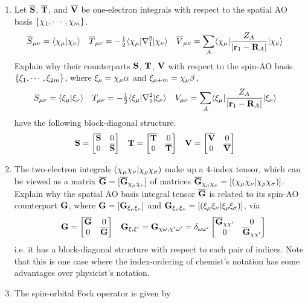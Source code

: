 \documentclass[fleqn,11pt]{article}
\begin{document}
\begin{enumerate}
  \item Let $\overline{\mathbf{S}}$, $\overline{\mathbf{T}}$, and $\overline{\mathbf{V}}$ be one-electron integrals with respect to the spatial AO basis $\{\chi_1,\cdots,\chi_m\}$.
\begin{align}
\label{space-ao-ints}
&
  \overline{S}_{\mu\nu}
=
  \langle\chi_{\mu}|\chi_{\nu}\rangle
&&
  \overline{T}_{\mu\nu}
=
  -\tfrac{1}{2}\langle\chi_{\mu}|\nabla_1^2|\chi_{\nu}\rangle
&&
  \overline{V}_{\mu\nu}
=
  \sum_A\langle\chi_{\mu}|\dfrac{Z_A}{|\mathbf{r}_1-\mathbf{R}_A|}|\chi_{\nu}\rangle
\end{align}
  Explain why their counterparts $\mathbf{S}$, $\mathbf{T}$, $\mathbf{V}$ with respect to the spin-AO basis $\{\xi_1,\cdots,\xi_{2m}\}$, where $\xi_\mu=\chi_\mu\alpha$ and $\xi_{\mu+m}=\chi_\mu\beta$,
\begin{align}
\label{space-ao-ints}
&
  S_{\mu\nu}
=
  \langle\xi_{\mu}|\xi_{\nu}\rangle
&&
  T_{\mu\nu}
=
  -\tfrac{1}{2}\langle\xi_{\mu}|\nabla_1^2|\xi_{\nu}\rangle
&&
  V_{\mu\nu}
=
  \sum_A\langle\xi_{\mu}|\dfrac{Z_A}{|\mathbf{r}_1-\mathbf{R}_A|}|\xi_{\nu}\rangle
\end{align}
have the following block-diagonal structure.
\begin{align}
\label{spin-ao-ints-1}
&
  \mathbf{S}
=
  \begin{bmatrix}\overline{\mathbf{S}}&0\\0&\overline{\mathbf{S}}\end{bmatrix}
&&
  \mathbf{T}
=
  \begin{bmatrix}\overline{\mathbf{T}}&0\\0&\overline{\mathbf{T}}\end{bmatrix}
&&
  \mathbf{V}
=
  \begin{bmatrix}\overline{\mathbf{V}}&0\\0&\overline{\mathbf{V}}\end{bmatrix}
\end{align}
  \item The two-electron integrals $(\chi_\mu\chi_\nu|\chi_\rho\chi_\sigma)$ make up a 4-index tensor, which can be viewed as a matrix $\overline{\mathbf{G}}=[\overline{\mathbf{G}}_{\chi_\mu\chi_\nu}]$ of matrices $\overline{\mathbf{G}}_{\chi_\mu\chi_\nu}=[(\chi_\mu\chi_\nu|\chi_\rho\chi_\sigma)]$.
  Explain why the spatial AO basis integral tensor $\overline{\mathbf{G}}$ is related to its spin-AO counterpart $\mathbf{G}$, where $\mathbf{G}=[\mathbf{G}_{\xi_\mu\xi_\nu}]$ and $\mathbf{G}_{\xi_\mu\xi_\nu}=[(\xi_\mu\xi_\nu|\xi_\rho\xi_\sigma)]$, via
\begin{align}
&&
  \mathbf{G}
=
  \begin{bmatrix}\overline{\mathbf{G}}&0\\0&\overline{\mathbf{G}}\end{bmatrix}
&&
  \mathbf{G}_{\xi,\xi'}
=
  \mathbf{G}_{\chi\omega,\chi'\omega'}
=
  \delta_{\omega\omega'}
  \begin{bmatrix}\overline{\mathbf{G}}_{\chi\chi'}&0\\0&\overline{\mathbf{G}}_{\chi\chi'}\end{bmatrix}
\end{align}
  i.e. it has a block-diagonal structure with respect to each pair of indices.
  Note that this is one case where the index-ordering of chemist's notation has some advantages over physicist's notation.
  \item The spin-orbital Fock operator is given by

\end{enumerate}
\end{document}
